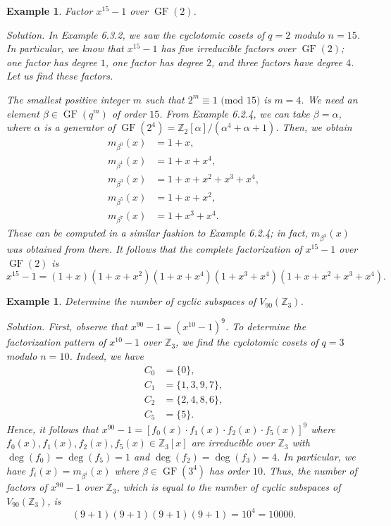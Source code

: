 \documentclass[10pt]{article}
\newcommand{\Z}{\mathbb{Z}}
\DeclareMathOperator{\GF}{GF}
\theoremstyle{newstyle}
\newtheorem{exmp}[thm]{Example}
\begin{document}
\begin{exmp}
Factor $x^{15}-1$ over $\GF(2)$.

{\sc Solution.} In Example 6.3.2, we saw the cyclotomic cosets of $q = 2$ modulo $n = 15$. 
In particular, we know that $x^{15} - 1$ has five irreducible factors over $\GF(2)$; 
one factor has degree $1$, one factor has degree $2$, and three factors have degree $4$. Let 
us find these factors. 

The smallest positive integer $m$ such that $2^m \equiv 1 \text{ (mod $15$)}$ is $m=4$. 
We need an element $\beta \in \GF(q^m)$ of order $15$. From Example 6.2.4, we can take 
$\beta = \alpha$, where $\alpha$ is a generator of $\GF(2^4) = \Z_2[\alpha]/(\alpha^4+\alpha+1)$. 
Then, we obtain 
\begin{align*}
    m_{\beta^0}(x) &= 1+x, \\
    m_{\beta^1}(x) &= 1+x+x^4, \\
    m_{\beta^3}(x) &= 1+x+x^2+x^3+x^4, \\
    m_{\beta^5}(x) &= 1+x+x^2, \\
    m_{\beta^7}(x) &= 1+x^3+x^4.
\end{align*}
These can be computed in a similar fashion to Example 6.2.4; in fact, $m_{\beta^3}(x)$ was obtained 
from there. It follows that the complete factorization of $x^{15} - 1$ over $\GF(2)$ is 
\[ x^{15} - 1 = (1+x)(1+x+x^2)(1+x+x^4)(1+x^3+x^4)(1+x+x^2+x^3+x^4). \]
\end{exmp}

\begin{exmp}
Determine the number of cyclic subspaces of $V_{90}(\Z_3)$. 

{\sc Solution.} First, observe that $x^{90} - 1 = (x^{10} - 1)^9$. To determine the factorization 
pattern of $x^{10} - 1$ over $\Z_3$, we find the cyclotomic cosets of $q = 3$ modulo 
$n = 10$. Indeed, we have 
\begin{align*}
    C_0 &= \{0\}, \\
    C_1 &= \{1, 3, 9, 7\}, \\
    C_2 &= \{2, 4, 8, 6\}, \\
    C_5 &= \{5\}.
\end{align*}
Hence, it follows that $x^{90} - 1 = [f_0(x) \cdot f_1(x) \cdot f_2(x) \cdot f_5(x)]^9$ 
where $f_0(x), f_1(x), f_2(x), f_5(x) \in \Z_3[x]$ are irreducible over $\Z_3$ with 
$\deg(f_0) = \deg(f_5) = 1$ and $\deg(f_2) = \deg(f_3) = 4$. In particular, we have 
$f_i(x) = m_{\beta^i}(x)$ where $\beta \in \GF(3^4)$ has order $10$. Thus, the number of 
factors of $x^{90} - 1$ over $\Z_3$, which is equal to the number of cyclic subspaces of 
$V_{90}(\Z_3)$, is 
\[ (9+1)(9+1)(9+1)(9+1) = 10^4 = 10000. \]
\end{exmp}
\end{document}
